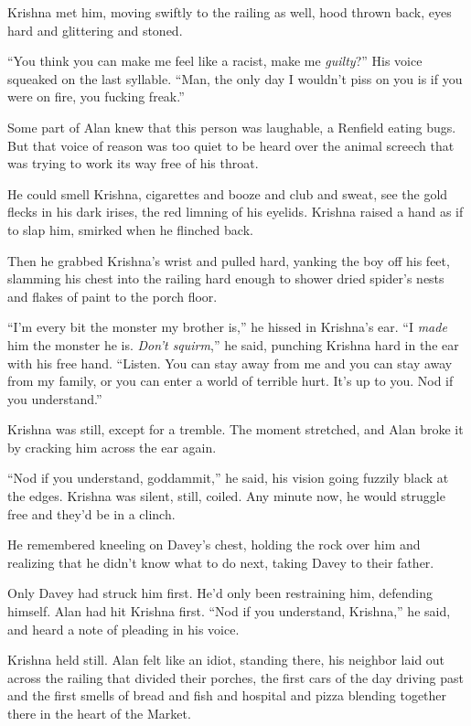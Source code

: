 \documentclass{article}
\begin{document}
Krishna met him, moving swiftly to the railing as well, hood thrown
back, eyes hard and glittering and stoned.

``You think you can make me feel like a racist, make me
\textit{guilty}?'' His voice squeaked on the last syllable.  ``Man,
the only day I wouldn't piss on you is if you were on fire, you
fucking freak.''

Some part of Alan knew that this person was laughable, a Renfield
eating bugs.  But that voice of reason was too quiet to be heard over
the animal screech that was trying to work its way free of his throat.

He could smell Krishna, cigarettes and booze and club and sweat, see
the gold flecks in his dark irises, the red limning of his eyelids. 
Krishna raised a hand as if to slap him, smirked when he flinched
back.

Then he grabbed Krishna's wrist and pulled hard, yanking the boy off
his feet, slamming his chest into the railing hard enough to shower
dried spider's nests and flakes of paint to the porch floor.

``I'm every bit the monster my brother is,'' he hissed in Krishna's
ear.  ``I \textit{made} him the monster he is.  \textit{Don't
squirm},'' he said, punching Krishna hard in the ear with his free
hand.  ``Listen.  You can stay away from me and you can stay away from
my family, or you can enter a world of terrible hurt.  It's up to you. 
Nod if you understand.''

Krishna was still, except for a tremble.  The moment stretched, and
Alan broke it by cracking him across the ear again.

``Nod if you understand, goddammit,'' he said, his vision going
fuzzily black at the edges.  Krishna was silent, still, coiled.  Any
minute now, he would struggle free and they'd be in a clinch.

He remembered kneeling on Davey's chest, holding the rock over him and
realizing that he didn't know what to do next, taking Davey to their
father.

Only Davey had struck him first.  He'd only been restraining him,
defending himself.  Alan had hit Krishna first.  ``Nod if you
understand, Krishna,'' he said, and heard a note of pleading in his
voice.

Krishna held still.  Alan felt like an idiot, standing there, his
neighbor laid out across the railing that divided their porches, the
first cars of the day driving past and the first smells of bread and
fish and hospital and pizza blending together there in the heart of
the Market.
\end{document}
